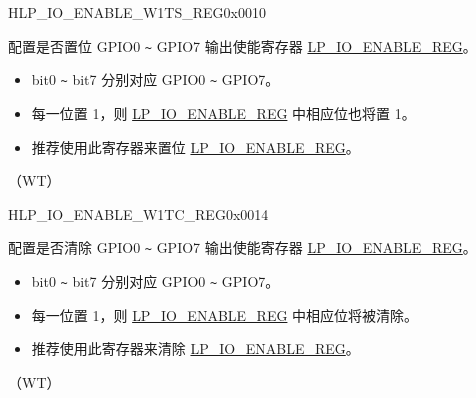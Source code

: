 \begin{register}{H}{LP\_IO\_ENABLE\_W1TS\_REG}{0x0010}\label{regdesc:LPIOENABLEW1TSREG}
%
%
\regnewline%
\begin{regdesc}\begin{reglist}
\label{fielddesc:LPGPIOENABLEW1TS}\item [LP\_GPIO\_ENABLE\_W1TS] 配置是否置位 GPIO0 \verb+~+ GPIO7 输出使能寄存器 \hyperref[regdesc:LPIOENABLEREG]{LP\_IO\_ENABLE\_REG}。\\
\begin{itemize}
    \item bit0 \verb+~+ bit7 分别对应 GPIO0 \verb+~+ GPIO7。
    \item 每一位置 1，则 \hyperref[regdesc:LPIOENABLEREG]{LP\_IO\_ENABLE\_REG} 中相应位也将置 1。
    \item 推荐使用此寄存器来置位 \hyperref[regdesc:LPIOENABLEREG]{LP\_IO\_ENABLE\_REG}。\end{itemize}（WT）
\end{reglist}\end{regdesc}
\end{register}


\begin{register}{H}{LP\_IO\_ENABLE\_W1TC\_REG}{0x0014}\label{regdesc:LPIOENABLEW1TCREG}
%
%
\regnewline%
\begin{regdesc}\begin{reglist}
\label{fielddesc:LPGPIOENABLEW1TC}\item [LP\_GPIO\_ENABLE\_W1TC] 配置是否清除 GPIO0 \verb+~+ GPIO7 输出使能寄存器 \hyperref[regdesc:LPIOENABLEREG]{LP\_IO\_ENABLE\_REG}。\\
\begin{itemize}
    \item bit0 \verb+~+ bit7 分别对应 GPIO0 \verb+~+ GPIO7。
    \item 每一位置 1，则 \hyperref[regdesc:LPIOENABLEREG]{LP\_IO\_ENABLE\_REG} 中相应位将被清除。
    \item 推荐使用此寄存器来清除 \hyperref[regdesc:LPIOENABLEREG]{LP\_IO\_ENABLE\_REG}。\end{itemize}（WT）
\end{reglist}\end{regdesc}
\end{register}


